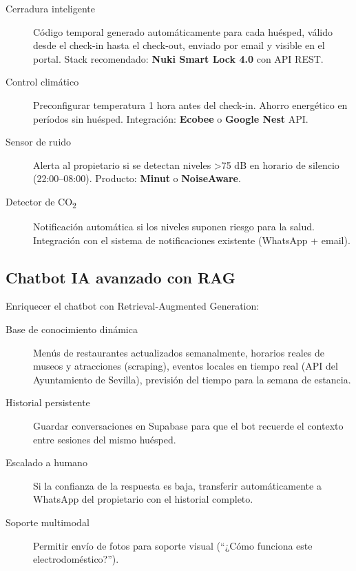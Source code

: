 \documentclass[12pt,a4paper,twoside,openright]{report}
\begin{document}
\begin{description}
  \item[Cerradura inteligente] Código temporal generado automáticamente para cada
    huésped, válido desde el check-in hasta el check-out, enviado por email y
    visible en el portal. Stack recomendado: \textbf{Nuki Smart Lock 4.0} con API REST.

  \item[Control climático] Preconfigurar temperatura 1 hora antes del check-in.
    Ahorro energético en períodos sin huésped. Integración: \textbf{Ecobee} o
    \textbf{Google Nest} API.

  \item[Sensor de ruido] Alerta al propietario si se detectan niveles >75 dB en
    horario de silencio (22:00--08:00). Producto: \textbf{Minut} o \textbf{NoiseAware}.

  \item[Detector de CO\textsubscript{2}] Notificación automática si los niveles
    suponen riesgo para la salud. Integración con el sistema de notificaciones
    existente (WhatsApp + email).
\end{description}

\subsection{Chatbot IA avanzado con RAG}

Enriquecer el chatbot con Retrieval-Augmented Generation:

\begin{description}
  \item[Base de conocimiento dinámica] Menús de restaurantes actualizados semanalmente,
    horarios reales de museos y atracciones (scraping), eventos locales en tiempo real
    (API del Ayuntamiento de Sevilla), previsión del tiempo para la semana de estancia.

  \item[Historial persistente] Guardar conversaciones en Supabase para que el bot
    recuerde el contexto entre sesiones del mismo huésped.

  \item[Escalado a humano] Si la confianza de la respuesta es baja, transferir
    automáticamente a WhatsApp del propietario con el historial completo.

  \item[Soporte multimodal] Permitir envío de fotos para soporte visual
    (``¿Cómo funciona este electrodoméstico?'').
\end{description}
\end{document}
